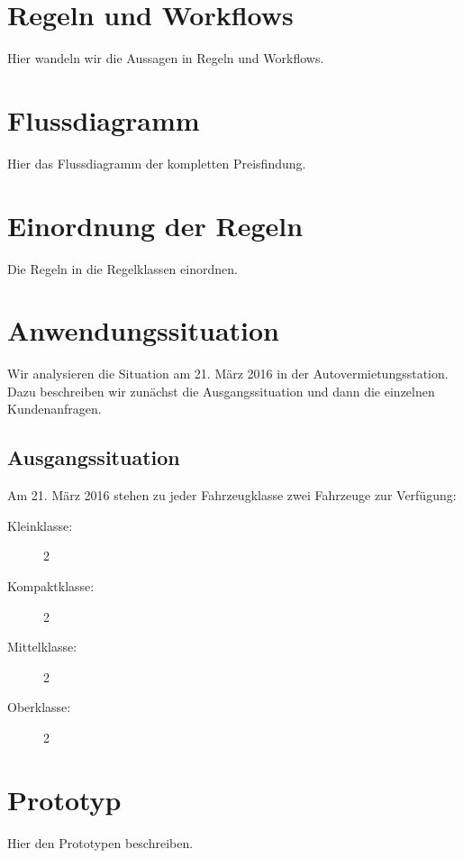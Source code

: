 



\setcounter{secnumdepth}{3}
\setcounter{tocdepth}{2}

\pagestyle{empty}


\tableofcontents
\setcounter{page}{1}

\pagestyle{scrheadings}

\newpage

\section{Regeln und Workflows}

Hier wandeln wir die Aussagen in Regeln und Workflows.

\section{Flussdiagramm}

Hier das Flussdiagramm der kompletten Preisfindung.

\section{Einordnung der Regeln}

Die Regeln in die Regelklassen einordnen.

\section{Anwendungssituation}

Wir analysieren die Situation am 21. März 2016 in der Autovermietungsstation.
Dazu beschreiben wir zunächst die Ausgangssituation und dann die einzelnen Kundenanfragen.

\subsection{Ausgangssituation}



Am 21. März 2016 stehen zu jeder Fahrzeugklasse zwei Fahrzeuge zur Verfügung:
\begin{description}
	\item[Kleinklasse:] 2
	\item[Kompaktklasse:] 2
	\item[Mittelklasse:] 2
	\item[Oberklasse:] 2
\end{description}

\section{Prototyp}

Hier den Prototypen beschreiben.

%


